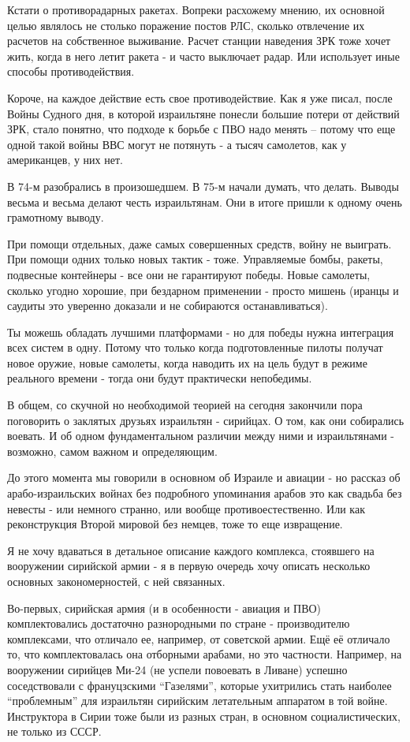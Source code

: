 Кстати о противорадарных ракетах. Вопреки расхожему мнению, их основной целью являлось не столько поражение постов РЛС, сколько отвлечение их расчетов на собственное выживание. Расчет станции наведения ЗРК тоже хочет жить, когда в него летит ракета - и часто выключает радар. Или использует иные способы противодействия.

Короче, на каждое действие есть свое противодействие. Как я уже писал, после Войны Судного дня, в которой израильтяне понесли большие потери от действий ЗРК, стало понятно, что подходе к борьбе с ПВО надо менять – потому что еще одной такой войны ВВС могут не потянуть - а тысяч самолетов, как у американцев, у них нет.

В 74-м разобрались в произошедшем. В 75-м начали думать, что делать. Выводы весьма и весьма делают честь израильтянам. Они в итоге пришли к одному очень грамотному выводу.

При помощи отдельных, даже самых совершенных средств, войну не выиграть. При помощи одних только новых тактик - тоже. Управляемые бомбы, ракеты, подвесные контейнеры - все они не гарантируют победы. Новые самолеты, сколько угодно хорошие, при бездарном применении - просто мишень (иранцы и саудиты это уверенно доказали и не собираются останавливаться).

Ты можешь обладать лучшими платформами - но для победы нужна интеграция всех систем в одну. Потому что только когда подготовленные пилоты получат новое оружие, новые самолеты, когда наводить их на цель будут в режиме реального времени - тогда они будут практически непобедимы.

В общем, со скучной но необходимой теорией на сегодня закончили пора поговорить о заклятых друзьях израильтян - сирийцах. О том, как они собирались воевать. И об одном фундаментальном различии между ними и израильтянами - возможно, самом важном и определяющим.

До этого момента мы говорили в основном об Израиле и авиации - но рассказ об арабо-израильских войнах без подробного упоминания арабов это как свадьба без невесты - или немного странно, или вообще противоестественно. Или как реконструкция Второй мировой без немцев, тоже то еще извращение.

Я не хочу вдаваться в детальное описание каждого комплекса, стоявшего на вооружении сирийской армии - я в первую очередь хочу описать несколько основных закономерностей, с ней связанных.

Во-первых, сирийская армия (и в особенности - авиация и ПВО) комплектовались достаточно разнородными по стране - производителю комплексами, что отличало ее, например, от советской армии. Ещё её отличало то, что комплектовалась она отборными арабами, но это частности. Например, на вооружении сирийцев Ми-24 (не успели повоевать в Ливане) успешно соседствовали с франуцзскими “Газелями”, которые ухитрились стать наиболее “проблемным” для израильтян сирийским летательным аппаратом в той войне. Инструктора в Сирии тоже были из разных стран, в основном социалистических, не только из СССР.

